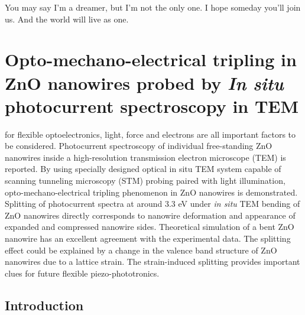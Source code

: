 
\begin{savequote}[75mm] 
You may say I'm a dreamer, but I'm not the only one. I hope someday you'll join us. And the world will live as one.
\end{savequote}

\chapter{Opto-mechano-electrical tripling in ZnO nanowires probed by \emph{In situ} photocurrent spectroscopy in TEM}

 for flexible optoelectronics, light, force and electrons are all important factors to be considered. Photocurrent spectroscopy of individual free-standing ZnO nanowires inside a high-resolution transmission electron microscope (TEM) is reported. By using specially designed optical in situ TEM system capable of scanning tunneling microscopy (STM) probing paired with light illumination, opto-mechano-electrical tripling phenomenon in ZnO nanowires is demonstrated. Splitting of photocurrent spectra at around 3.3 eV under {\em in situ} TEM bending of ZnO nanowires directly corresponds to nanowire deformation and appearance of expanded and compressed nanowire sides. Theoretical simulation of a bent ZnO nanowire has an excellent agreement with the experimental data. The splitting effect could be explained by a change in the valence band structure of ZnO nanowires due to a lattice strain. The strain-induced splitting provides important clues for future flexible piezo-phototronics. 

\section{Introduction}


